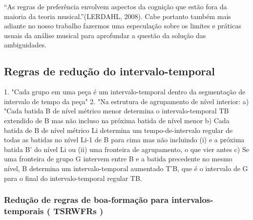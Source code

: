 \documentclass[
	12pt,				%
	openright,			%
	twoside,			%
	a4paper,			%
	english,			%
	french,				%
	spanish,			%
	brazil				%
	]{abntex2}
\begin{document}
“As regras de preferência envolvem aspectos da cognição que estão fora da maioria da teoria musical.”(LERDAHL, 2008). Cabe portanto também mais adiante no nosso trabalho fazermos uma especulação sobre os limites e práticas usuais da análise musical para aprofundar a questão da solução das ambiguidades.

\subsection{Regras de redução do intervalo-temporal}




\begin{citacao}
1. "Cada grupo em uma peça é um intervalo-temporal dentro da segmentação de intervalo de tempo da peça" 
2. "Na estrutura de agrupamento de nível interior:
a) "Cada batida B de nível métrico menor determina o intervalo-temporal TB extendido de B mas não incluso na próxima batida de nível menor 
b) Cada batida de B de nível métrico Li determina um tempo-de-intervalo regular de todas as batidas no nível Li-1 de B para cima mas não incluindo (i) e a próxima batida B' do nível Li ou (ii) uma fronteira de agrupamento, o que vier antes 
c) Se uma fronteira de grupo G intervem entre B e a batida precedente no mesmo nível, B determina um intervalo-temporal aumentado T'B, que é o intervalo de G para o final do intervalo-temporal regular TB.
 \cite{lerdahl1983generative}
\end{citacao}


\subsubsection{Redução de regras de boa-formação para intervalos-temporais ( TSRWFRs )}
\end{document}
